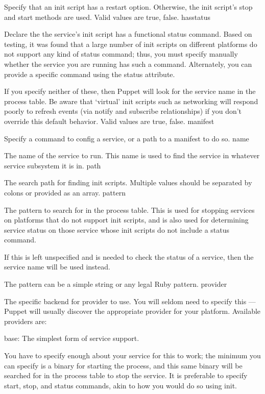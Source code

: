 Specify that an init script has a restart option. Otherwise, the init script’s stop and start methods are used. Valid values are true, false.
hasstatus

Declare the the service’s init script has a functional status command. Based on testing, it was found that a large number of init scripts on different platforms do not support any kind of status command; thus, you must specify manually whether the service you are running has such a command. Alternately, you can provide a specific command using the status attribute.

If you specify neither of these, then Puppet will look for the service name in the process table. Be aware that ‘virtual’ init scripts such as networking will respond poorly to refresh events (via notify and subscribe relationships) if you don’t override this default behavior. Valid values are true, false.
manifest

Specify a command to config a service, or a path to a manifest to do so.
name

The name of the service to run. This name is used to find the service in whatever service subsystem it is in.
path

The search path for finding init scripts. Multiple values should be separated by colons or provided as an array.
pattern

The pattern to search for in the process table. This is used for stopping services on platforms that do not support init scripts, and is also used for determining service status on those service whose init scripts do not include a status command.

If this is left unspecified and is needed to check the status of a service, then the service name will be used instead.

The pattern can be a simple string or any legal Ruby pattern.
provider

The specific backend for provider to use. You will seldom need to specify this — Puppet will usually discover the appropriate provider for your platform. Available providers are:

    base: The simplest form of service support.

    You have to specify enough about your service for this to work; the minimum you can specify is a binary for starting the process, and this same binary will be searched for in the process table to stop the service. It is preferable to specify start, stop, and status commands, akin to how you would do so using init.


